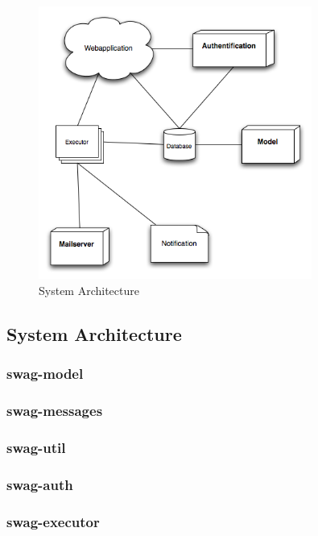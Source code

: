 \documentclass[a4paper]{article}
\begin{document}
\begin{figure}[htb]
\begin{center}
\leavevmode
\includegraphics[width=0.8\textwidth]{Arch.png}
\end{center}
\caption{System Architecture}

\end{figure}


\subsection{System Architecture}

\subsubsection{swag-model}

\subsubsection{swag-messages}

\subsubsection{swag-util}

\subsubsection{swag-auth}

\subsubsection{swag-executor}
\end{document}

